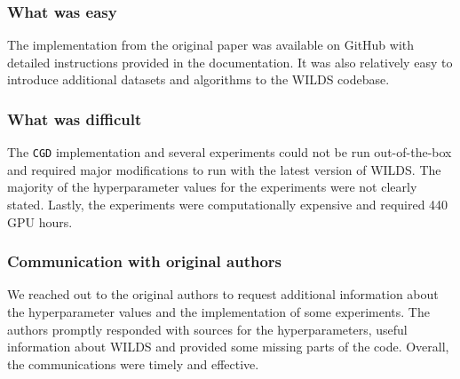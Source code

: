 \subsubsection*{What was easy}
The implementation from the original paper was available on GitHub with detailed instructions provided in the documentation. It was also relatively easy to introduce additional datasets and algorithms to the WILDS codebase.

\subsubsection*{What was difficult}
The \texttt{CGD} implementation and several experiments could not be run out-of-the-box and required major modifications to run with the latest version of WILDS. The majority of the hyperparameter values for the experiments were not clearly stated. Lastly, the experiments were computationally expensive and required 440 GPU hours.

\subsubsection*{Communication with original authors}
We reached out to the original authors to request additional information about the hyperparameter values and the implementation of some experiments. The authors promptly responded with sources for the hyperparameters, useful information about WILDS and provided some missing parts of the code. Overall, the communications were timely and effective.

